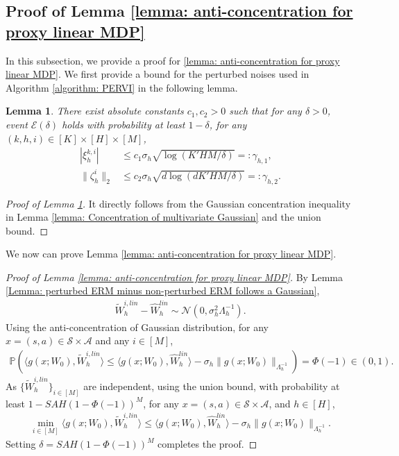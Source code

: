 \documentclass{article} \usepackage{iclr2023/iclr2023_conference,times}
\newtheorem{lemma}{Lemma}[section]
\begin{document}
\subsection{Proof of Lemma \ref{lemma: anti-concentration for proxy linear MDP}}

In this subsection, we provide a proof for \ref{lemma: anti-concentration for proxy linear MDP}. We first provide a bound for the perturbed noises used in Algorithm \ref{algorithm: PERVI} in the following lemma.
\begin{lemma}
There exist absolute constants $c_1, c_2 > 0$ such that for any $\delta > 0$, event $\mathcal{E}(\delta)$ holds with probability at least $1 - \delta$, for any $(k,h,i) \in [K] \times [H] \times [M]$, 
\begin{align*}
     |\xi^{k,i}_h| &\leq c_1 \sigma_h \sqrt{\log (K'HM / \delta)} =: \gamma_{h,1}, \\
     \| \zeta^i_h \|_2 &\leq c_2 \sigma_h \sqrt{d \log (d K'HM / \delta)} =: \gamma_{h,2}. 
\end{align*}
\label{Lemma: good events where the noises are bounded}
\end{lemma}
\begin{proof}[Proof of Lemma \ref{Lemma: good events where the noises are bounded}]
It directly follows from the Gaussian concentration inequality in Lemma \ref{lemma: Concentration of multivariate Gaussian} and the union bound.
\end{proof}





We now can prove Lemma \ref{lemma: anti-concentration for proxy linear MDP}. 
\begin{proof}[Proof of Lemma \ref{lemma: anti-concentration for proxy linear MDP}]
By Lemma \ref{Lemma: perturbed ERM minus non-perturbed ERM follows a Gaussian}, 
\begin{align*}
    \tilde{W}^{i,lin}_h - \hat{W}^{lin}_h \sim \mathcal{N}(0, \sigma^2_h \Lambda_h^{-1}). 
\end{align*}
Using the anti-concentration of Gaussian distribution, for any $x = (s,a) \in \mathcal{S} \times \mathcal{A}$ and any $i \in [M]$, 
\begin{align*}
    \mathbb{P} \left( \langle g(x; W_0), \tilde{W}^{i,lin}_h \rangle \leq \langle g(x; W_0), \hat{W}^{lin}_h \rangle - \sigma_h \| g(x; W_0) \|_{\Lambda_h^{-1}} \right) = \Phi(-1) \in (0,1). 
\end{align*}
As $\{\tilde{W}^{i,lin}_h \}_{i \in [M]}$ are independent, using the union bound, with probability at least $1 - SAH (1 - \Phi(-1))^M$, for any $x = (s,a) \in \mathcal{S} \times \mathcal{A}$, and $h \in [H]$,
\begin{align*}
    \min_{i \in [M]}\langle g(x; W_0), \tilde{W}^{i,lin}_h \rangle \leq \langle g(x; W_0), \hat{W}^{lin}_h \rangle - \sigma_h \| g(x; W_0) \|_{\Lambda_h^{-1}}. 
\end{align*}
Setting $\delta = SAH (1 - \Phi(-1))^M$ completes the proof.
\end{proof}
\end{document}
